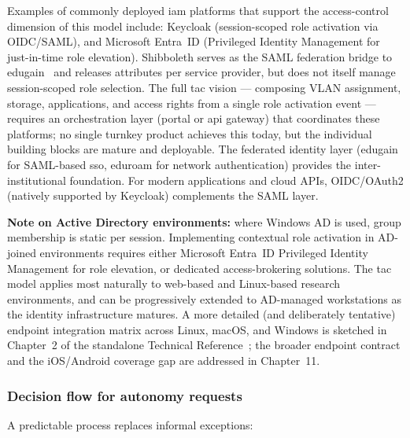 \noindent
Examples of commonly deployed \gls{iam} platforms that support the
access-control dimension of this model include: Keycloak
(session-scoped role activation via OIDC/SAML), and Microsoft
Entra~ID (Privileged Identity Management for just-in-time role
elevation). Shibboleth serves as the SAML federation bridge to
\gls{edugain}~\cite{edugain} and releases attributes per service
provider, but does not itself manage session-scoped role selection. The full \gls{tac} vision ---
composing VLAN assignment, storage, applications, and access rights
from a single role activation event --- requires an orchestration
layer (portal or \gls{api} gateway) that coordinates these platforms;
no single turnkey product achieves this today, but the individual
building blocks are mature and deployable. The federated identity
layer (\gls{edugain} for SAML-based \gls{sso}, \gls{eduroam} for
network authentication) provides the inter-institutional foundation.
For modern applications and cloud APIs, OIDC/OAuth2 (natively
supported by Keycloak) complements the SAML layer.

\smallskip\noindent
\textbf{Note on Active Directory environments:} where Windows AD is
used, group membership is static per session. Implementing contextual
role activation in AD-joined environments requires either Microsoft
Entra~ID Privileged Identity Management for role elevation, or
dedicated access-brokering solutions. The \gls{tac} model applies
most naturally to web-based and Linux-based research environments,
and can be progressively extended to AD-managed workstations as
the identity infrastructure matures. A more detailed (and deliberately
tentative) endpoint integration matrix across Linux, macOS, and
Windows is sketched in Chapter~2 of the standalone Technical
Reference~\cite{ng-tech-ref-2026}; the broader endpoint contract
and the iOS/Android coverage gap are addressed in Chapter~11.

\subsubsection{Decision flow for autonomy requests}

A predictable process replaces informal exceptions:

